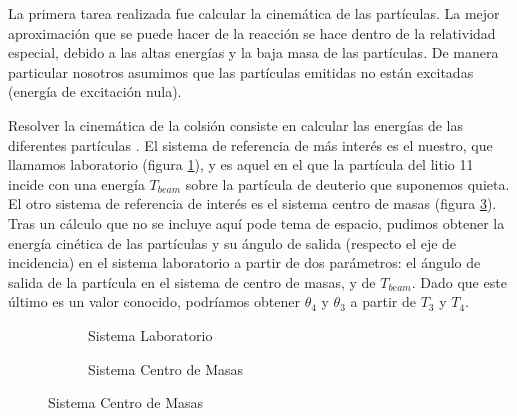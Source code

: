 \documentclass[12pt,a4paper]{article}
\numberwithin{equation}{section}
\numberwithin{figure}{section}
\begin{document}
La primera tarea realizada fue calcular la cinemática de las partículas. La mejor aproximación que se puede hacer de la reacción se hace dentro de la relatividad especial, debido a las altas energías y la baja masa de las partículas. De manera particular nosotros asumimos que las partículas emitidas no están excitadas (energía de excitación nula).

Resolver la cinemática de la colsión consiste en calcular las energías de las diferentes partículas . El sistema de referencia de más interés es el nuestro, que llamamos laboratorio (figura \ref{Fig:2.3.01-Lab}), y es aquel en el que la partícula del litio 11 incide con una energía $T_{beam}$ sobre la partícula de deuterio que suponemos quieta. El otro sistema de referencia de interés es el sistema centro de masas (figura \ref{Fig:2.3.01-CM}). \\

Tras un cálculo que no se incluye aquí pode tema de espacio, pudimos obtener la energía cinética de las partículas y su ángulo de salida (respecto el eje de incidencia) en el sistema laboratorio a partir de dos parámetros: el ángulo de salida de la partícula en el sistema de centro de masas, y de $T_{beam}$. Dado que este último es un valor conocido, podríamos obtener $\theta_4$ y $\theta_3$ a partir de $T_3$ y $T_4$.   \\

\begin{figure}[h!] \centering
\begin{subfigure}[b]{0.45\linewidth} \centering
    \caption{Sistema Laboratorio}
    \label{Fig:2.3.01-Lab}
\end{subfigure}
\begin{subfigure}[b]{0.45\linewidth} \centering
    \caption{Sistema Centro de Masas}
    \label{Fig:2.3.01-CM}
\end{subfigure}
\end{figure}
\end{document}
